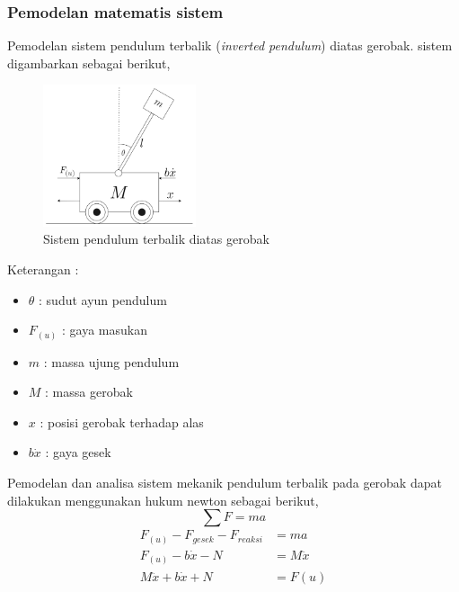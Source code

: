\documentclass[../cover.tex]{subfiles}
\begin{document}
        \subsubsection{Pemodelan matematis sistem}
            Pemodelan sistem pendulum terbalik (\textit{inverted pendulum}) diatas gerobak. sistem digambarkan sebagai berikut,
            \begin{figure}[H]
                \centering
                \includegraphics[width = 0.4\textwidth]{assets/image/soal_2.png}
                \caption{Sistem pendulum terbalik diatas gerobak}
                \label{gambar_2}
            \end{figure}
            \begin{center}
            Keterangan :
                \begin{minipage}[c]{8cm}
                    \begin{itemize}
                        \item $\theta$ : sudut ayun pendulum
                        \item $F_{(u)}$ : gaya masukan
                        \item $m$ : massa ujung pendulum
                        \item $M$ : massa gerobak
                        \item $x$ : posisi gerobak terhadap alas
                        \item $b\dot{x}$ : gaya gesek
                    \end{itemize}
                \end{minipage}
            \end{center}
            Pemodelan dan analisa sistem mekanik pendulum terbalik pada gerobak dapat dilakukan menggunakan hukum newton sebagai berikut,
            \begin{equation}
                \sum F = ma
                \label{persamaan_7}
            \end{equation}
            \begin{equation}
                \begin{split}
                    F_{(u)} - F_{gesek} - F_{reaksi} &= ma \\[5pt]
                    F_{(u)} - b\dot{x} - N &= M\ddot{x} \\[5pt]
                    M\ddot{x} + b\dot{x} + N &= F{(u)}
                    \label{persamaan_8}
                \end{split}
            \end{equation}
\end{document}
